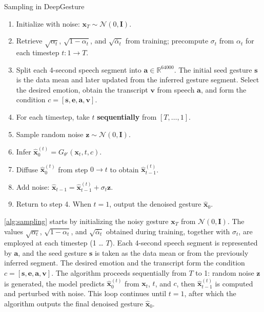 \begin{algorithm}[h]
	\caption{Sampling in DeepGesture}
	\label{alg:sampling}
	\setlength{\baselineskip}{10pt}
	\begin{enumerate}
		\item Initialize with noise: $\mathbf{x}_T \sim \mathcal{N}(0, \mathbf{I})$.
		\item Retrieve $\sqrt{\alpha_t}$, $\sqrt{1 - \alpha_t}$, and $\sqrt{\bar{\alpha}_t}$ from training; precompute $\sigma_t$ from $\alpha_t$ for each timestep $t: 1 \rightarrow T$.
		\item Split each 4-second speech segment into $\mathbf{a} \in \mathbb{R}^{64000}$.  
		The initial seed gesture $\mathbf{s}$ is the data mean and later updated from the inferred gesture segment.  
		Select the desired emotion, obtain the transcript $\mathbf{v}$ from speech $\mathbf{a}$, and form the condition $c = [\mathbf{s}, \mathbf{e}, \mathbf{a}, \mathbf{v}]$.
		\item For each timestep, take $t$ \textbf{sequentially} from $[T, \dots, 1]$.
		\item Sample random noise $\mathbf{z} \sim \mathcal{N}(0, \mathbf{I})$.
		\item Infer $\hat{\mathbf{x}}_0^{(t)} = G_{\theta'}(\mathbf{x}_t, t, c)$.
		\item Diffuse $\hat{\mathbf{x}}_0^{(t)}$ from step $0 \rightarrow t$ to obtain $\hat{\mathbf{x}}_{t-1}^{(t)}$.
		\item Add noise: $\hat{\mathbf{x}}_{t-1} = \hat{\mathbf{x}}_{t-1}^{(t)} + \sigma_t \mathbf{z}$.
		\item Return to step 4.  
		When $t = 1$, output the denoised gesture $\hat{\mathbf{x}}_0$.
	\end{enumerate}
\end{algorithm}


\autoref{alg:sampling} starts by initializing the noisy gesture $\mathbf{x}_T$ from $\mathcal{N}(0, \mathbf{I})$.  
The values $\sqrt{\alpha_t}$, $\sqrt{1-\alpha_t}$, and $\sqrt{\bar{\alpha}_t}$ obtained during training, together with $\sigma_t$, are employed at each timestep (1 … $T$).  
Each 4-second speech segment is represented by $\mathbf{a}$, and the seed gesture $\mathbf{s}$ is taken as the data mean or from the previously inferred segment.  
The desired emotion and the transcript form the condition $c = [\mathbf{s}, \mathbf{e}, \mathbf{a}, \mathbf{v}]$.  
The algorithm proceeds sequentially from $T$ to 1: random noise $\mathbf{z}$ is generated, the model predicts $\hat{\mathbf{x}}_0^{(t)}$ from $\mathbf{x}_t$, $t$, and $c$, then $\hat{\mathbf{x}}_{t-1}^{(t)}$ is computed and perturbed with noise.  
This loop continues until $t=1$, after which the algorithm outputs the final denoised gesture $\hat{\mathbf{x}}_0$.
